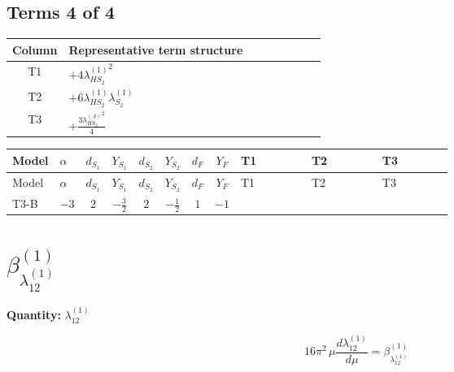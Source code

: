 \documentclass[8pt]{article}
\begin{document}
\begin{landscape}
\subsection*{Terms 4 of 4}
\begin{center}
\begin{tabular}{@{}c >{\raggedright\arraybackslash}p{0.82\linewidth}@{}}
\toprule
Column & Representative term structure \\
\midrule
T1 & \(\displaystyle +4 {\lambda_{HS_2}^{(1)}}^2\) \\
\midrule
T2 & \(\displaystyle +6 {\lambda_{HS_2}^{(1)}} {\lambda_{S_2}^{(1)}}\) \\
\midrule
T3 & \(\displaystyle +\frac{3 {\lambda_{HS_2}^{(A)}}^2}{4}\) \\
\midrule
\bottomrule
\end{tabular}
\end{center}
\smallskip
\tiny
\begin{longtable}{@{}llcccccc >{\raggedright\arraybackslash}p{0.21\linewidth} >{\raggedright\arraybackslash}p{0.21\linewidth} >{\raggedright\arraybackslash}p{0.21\linewidth}@{}}
\toprule
Model & $\alpha$ & $d_{S_1}$ & $Y_{S_1}$ & $d_{S_2}$ & $Y_{S_2}$ & $d_F$ & $Y_F$ & T1 & T2 & T3 \\
\midrule
\endfirsthead
\toprule
Model & $\alpha$ & $d_{S_1}$ & $Y_{S_1}$ & $d_{S_2}$ & $Y_{S_2}$ & $d_F$ & $Y_F$ & T1 & T2 & T3 \\
\midrule
\endhead
T3-B & $-3$ & $2$ & $-\frac{3}{2}$ & $2$ & $-\frac{1}{2}$ & $1$ & $-1$ & \scriptsize\adjustbox{max width=\linewidth}{$\begin{gathered} +4 {\lambda_{HS_2}^{(1)}}^2\end{gathered}$} & \scriptsize\adjustbox{max width=\linewidth}{$\begin{gathered} +6 {\lambda_{HS_2}^{(1)}} {\lambda_{S_2}^{(1)}}\end{gathered}$} & \scriptsize\adjustbox{max width=\linewidth}{$\begin{gathered} +\frac{3 {\lambda_{HS_2}^{(A)}}^2}{4}\end{gathered}$} \\
\midrule
\bottomrule
\end{longtable}
\clearpage
\section*{$\beta_{\lambda_{12}^{(1)}}^{(1)}$}
\noindent\textbf{Quantity: }$\lambda_{12}^{(1)}$\par\smallskip
\[16\pi^2\,\mu\frac{d \lambda_{12}^{(1)}}{d\mu}=\beta_{\lambda_{12}^{(1)}}^{(1)}\]

\end{landscape}
\end{document}
